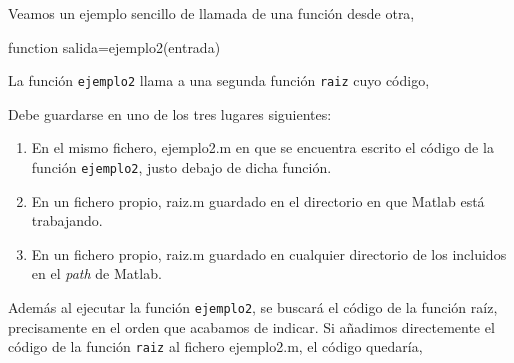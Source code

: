 Veamos un ejemplo sencillo de llamada de una función desde otra,

function salida=ejemplo2(entrada)



La función \texttt{ejemplo2} llama a una segunda función \texttt{raiz} cuyo código,


Debe guardarse en uno de los tres lugares siguientes:
\begin{enumerate}
\item En el mismo fichero, ejemplo2.m en que se encuentra escrito el código de la función \texttt{ejemplo2}, justo debajo de dicha función.
\item En un fichero propio, raiz.m guardado en el directorio en que Matlab está trabajando.
\item En un fichero propio, raiz.m guardado en cualquier directorio de los incluidos en el \emph{path} de Matlab.
\end{enumerate}

Además al ejecutar la función \texttt{ejemplo2}, se buscará el código de la función raíz, precisamente en el orden que acabamos de indicar. Si añadimos directemente el código de la función \texttt{raiz} al fichero ejemplo2.m, el código quedaría,







